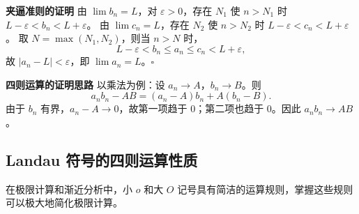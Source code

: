 \documentclass[fontset=fandol]{ctexart}
\newenvironment{custom}[1]{\par\noindent\textbf{#1}\quad}{\par\vspace{0.8em}}
\begin{document}
\begin{custom}{夹逼准则的证明}
由 \(\lim b_n = L\)，对 \(\varepsilon > 0\)，存在 \(N_1\) 使 \(n > N_1\) 时 \(L - \varepsilon < b_n < L + \varepsilon\)。
由 \(\lim c_n = L\)，存在 \(N_2\) 使 \(n > N_2\) 时 \(L - \varepsilon < c_n < L + \varepsilon\)。
取 \(N = \max(N_1, N_2)\)，则当 \(n > N\) 时，
\[
L - \varepsilon < b_n \leq a_n \leq c_n < L + \varepsilon,
\]
故 \(|a_n - L| < \varepsilon\)，即 \(\lim a_n = L\)。\(\square\)
\end{custom}

\begin{custom}{四则运算的证明思路}
以乘法为例：设 \(a_n \to A\)，\(b_n \to B\)。则
\[
a_n b_n - AB = (a_n - A)b_n + A(b_n - B).
\]
由于 \(b_n\) 有界，\(a_n - A \to 0\)，故第一项趋于 0；第二项也趋于 0。因此 \(a_n b_n \to AB\)。
\end{custom}

\subsection{Landau 符号的四则运算性质}

在极限计算和渐近分析中，小 \(o\) 和大 \(O\) 记号具有简洁的运算规则，掌握这些规则可以极大地简化极限计算。
\end{document}

